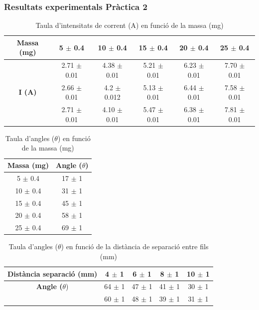\documentclass[11pt]{article}
\numberwithin{equation}{section}
\numberwithin{figure}{section}
\numberwithin{table}{section}
\begin{document}
\subsubsection{Resultats experimentals Pràctica 2}\label{PR2_taules_dades_exp}


\begin{table}[h!]
\centering
\caption{Taula d'intensitats de corrent (A) en funció de la massa (mg)}
\begin{tabular}{|c|c|c|c|c|c|}
\hline
\textbf{Massa (mg)} & \textbf{5 $\pm$ 0.4 } & \textbf{10 $\pm$ 0.4 } & \textbf{15 $\pm$ 0.4} & \textbf{20 $\pm$ 0.4 } & \textbf{25 $\pm$ 0.4 } \\
\hline
 & 2.71 $\pm$ 0.01 & 4.38 $\pm$ 0.01 & 5.21 $\pm$ 0.01 & 6.23 $\pm$ 0.01 & 7.70 $\pm$ 0.01 \\
\textbf{I (A)} & 2.66 $\pm$ 0.01 & 4.2 $\pm$ 0.012 & 5.13 $\pm$ 0.01 & 6.44 $\pm$ 0.01 & 7.58 $\pm$ 0.01 \\
 & 2.71 $\pm$ 0.01 & 4.10 $\pm$ 0.01 & 5.47 $\pm$ 0.01 & 6.38 $\pm$ 0.01 & 7.81 $\pm$ 0.01 \\
\hline
\end{tabular}
\end{table}

\begin{table}[H]
\centering
\caption{Taula d'angles ($\theta$) en funció de la massa (mg)}
\begin{tabular}{|c|c|}
\hline
\textbf{Massa (mg)} & \textbf{Angle ($\theta$)} \\
\hline
5 $\pm$ 0.4   & 17 $\pm$ 1 \\
10 $\pm$ 0.4  & 31 $\pm$ 1 \\
15 $\pm$ 0.4  & 45 $\pm$ 1 \\
20 $\pm$ 0.4  & 58 $\pm$ 1 \\
25 $\pm$ 0.4  & 69 $\pm$ 1 \\
\hline
\end{tabular}
\end{table}

\begin{table}[H]
\centering
\caption{Taula d'angles ($\theta$) en funció de la distància de separació entre fils (mm)}
\begin{tabular}{|c|c|c|c|c|}
\hline
\textbf{Distància separació (mm)} & \textbf{4 $\pm$ 1} & \textbf{6 $\pm$ 1} & \textbf{8 $\pm$ 1} & \textbf{10 $\pm$ 1} \\
\hline
\textbf{Angle ($\theta$}) & 64 $\pm$ 1  & 47  $\pm$ 1 & 41  $\pm$ 1 & 30  $\pm$ 1 \\
   & 60  $\pm$ 1 & 48  $\pm$ 1 & 39  $\pm$ 1 & 31  $\pm$ 1 \\
\hline
\end{tabular}
\end{table}
\end{document}
